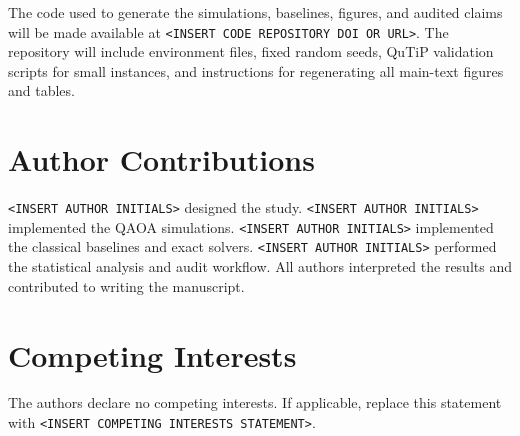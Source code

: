 \documentclass[reprint,aps,longbibliography]{revtex4-2}
\begin{document}
The code used to generate the simulations, baselines, figures, and audited claims will be made available at \texttt{<INSERT CODE REPOSITORY DOI OR URL>}. The repository will include environment files, fixed random seeds, QuTiP validation scripts for small instances, and instructions for regenerating all main-text figures and tables.

\section*{Author Contributions}

\texttt{<INSERT AUTHOR INITIALS>} designed the study. \texttt{<INSERT AUTHOR INITIALS>} implemented the QAOA simulations. \texttt{<INSERT AUTHOR INITIALS>} implemented the classical baselines and exact solvers. \texttt{<INSERT AUTHOR INITIALS>} performed the statistical analysis and audit workflow. All authors interpreted the results and contributed to writing the manuscript.

\section*{Competing Interests}

The authors declare no competing interests. If applicable, replace this statement with \texttt{<INSERT COMPETING INTERESTS STATEMENT>}.



\end{document}
